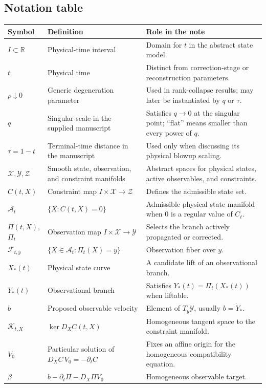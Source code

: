 \documentclass[12pt]{article}
\newcommand{\R}{\mathbb R}
\newcommand{\A}{\mathcal A}
\newcommand{\X}{\mathcal X}
\newcommand{\Y}{\mathcal Y}
\newcommand{\Zs}{\mathcal Z}
\newcommand{\Kt}{\mathcal K}
\newcommand{\Fib}{\mathscr F}
\begin{document}
\subsection{Notation table}
\renewcommand{\arraystretch}{1.12}
\begin{longtable}{p{}p{}p{}}
\toprule
Symbol & Definition & Role in the note \\
\midrule
\endhead
$I\subset\R$ & Physical-time interval & Domain for $t$ in the abstract state model. \\
$t$ & Physical time & Distinct from correction-stage or reconstruction parameters. \\
$\rho\downarrow0$ & Generic degeneration parameter & Used in rank-collapse results; may later be instantiated by $q$ or $\tau$. \\
$q$ & Singular scale in the supplied manuscript & Satisfies $q\to0$ at the singular point; ``flat'' means smaller than every power of $q$. \\
$\tau=1-t$ & Terminal-time distance in the manuscript & Used only when discussing its physical blowup scaling. \\
$\X,\Y,\Zs$ & Smooth state, observation, and constraint manifolds & Abstract spaces for physical states, active observables, and constraints. \\
$C(t,X)$ & Constraint map $I\times\X\to\Zs$ & Defines the admissible state set. \\
$\A_t$ & $\{X:C(t,X)=0\}$ & Admissible physical state manifold when $0$ is a regular value of $C_t$. \\
$\Pi(t,X)$, $\Pi_t$ & Observation map $I\times\X\to\Y$ & Selects the branch actively propagated or corrected. \\
$\Fib_{t,y}$ & $\{X\in\A_t:\Pi_t(X)=y\}$ & Observation fiber over $y$. \\
$X_*(t)$ & Physical state curve & A candidate lift of an observational branch. \\
$Y_*(t)$ & Observational branch & Satisfies $Y_*(t)=\Pi_t(X_*(t))$ when liftable. \\
$b$ & Proposed observable velocity & Element of $T_y\Y$, usually $b=\dot Y_*$. \\
$\Kt_{t,X}$ & $\ker D_XC(t,X)$ & Homogeneous tangent space to the constraint manifold. \\
$V_0$ & Particular solution of $D_XC\,V_0=-\partial_tC$ & Fixes an affine origin for the homogeneous compatibility equation. \\
$\beta$ & $b-\partial_t\Pi-D_X\Pi V_0$ & Homogeneous observable target. \\

\end{longtable}
\end{document}
